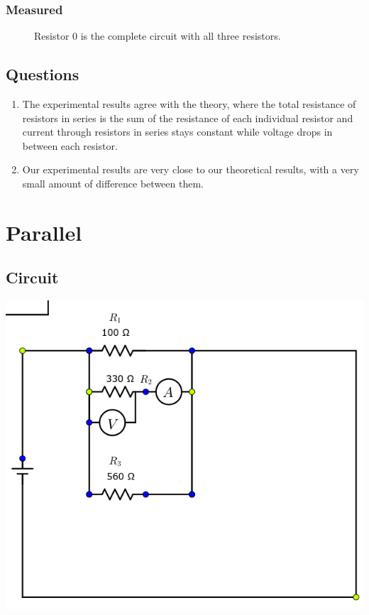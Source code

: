 \documentclass{article}
\begin{document}
\subsubsection{Measured}
\begin{figure}[H]
    \begin{center}
        \caption{Resistor 0 is the complete circuit with all three resistors.}
    \end{center}
\end{figure}
\subsection{Questions}
\begin{enumerate}
    \item The experimental results agree with the theory, where the total resistance of resistors in series is the sum of the resistance of each individual resistor and current through resistors in series stays constant while voltage drops in between each resistor.
    \item Our experimental results are very close to our theoretical results, with a very small amount of difference between them.
\end{enumerate}

\section{Parallel}
\subsection{Circuit}
\begin{center}
    \includegraphics[scale=0.5]{parallel}
\end{center}
\end{document}
